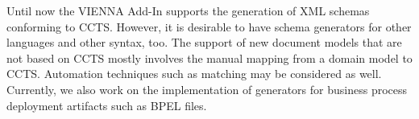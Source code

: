 \documentclass{acm_proc_article-sp}
\begin{document}
Until now the VIENNA Add-In supports the generation of XML schemas conforming to CCTS. However, it is desirable to have schema generators for other languages and other syntax, too. The support of new document models that are not based on CCTS mostly involves the manual mapping from a domain model to CCTS. Automation techniques such as matching may be considered as well. Currently, we also work on the implementation of generators for business process deployment artifacts such as BPEL files.









  
\end{document}

